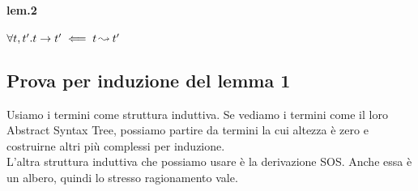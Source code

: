 \documentclass{article}
\begin{document}
\paragraph{lem.2} $\forall t,t'.t\to t' \impliedby t\operatorname{ \leadsto^{} } t'$

\subsection{Prova per induzione del lemma 1}
Usiamo i termini come struttura induttiva. Se vediamo i termini come il loro Abstract Syntax Tree, possiamo partire da termini la cui altezza è zero e costruirne altri più complessi per induzione. \\
L'altra struttura induttiva che possiamo usare è la derivazione SOS. Anche essa è un albero, quindi lo stresso ragionamento vale.
\end{document}
